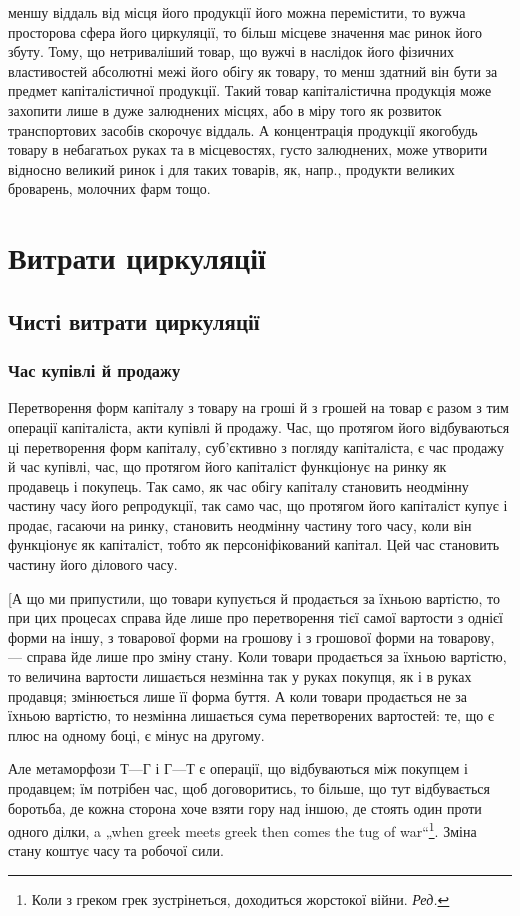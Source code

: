 \parcont{}  %
меншу віддаль від місця його продукції його можна перемістити, то
вужча просторова сфера його циркуляції, то більш місцеве значення має
ринок його збуту. Тому, що нетриваліший товар, що вужчі в наслідок
його фізичних властивостей абсолютні межі його обігу як товару, то
менш здатний він бути за предмет капіталістичної продукції. Такий
товар капіталістична продукція може захопити лише в дуже залюднених
місцях, або в міру того як розвиток транспортових засобів скорочує
віддаль. А концентрація продукції якогобудь товару в небагатьох руках
та в місцевостях, густо залюднених, може утворити відносно великий ринок
і для таких товарів, як, напр., продукти великих броварень, молочних
фарм тощо.

\section{Витрати циркуляції}

\subsection{Чисті витрати циркуляції}

\subsubsection{Час купівлі й продажу}

Перетворення форм капіталу з товару на гроші й з грошей на
товар є разом з тим операції капіталіста, акти купівлі й продажу. Час,
що протягом його відбуваються ці перетворення форм капіталу, суб’єктивно
з погляду капіталіста, є час продажу й час купівлі, час, що протягом
його капіталіст функціонує на ринку як продавець і покупець. Так само,
як час обігу капіталу становить неодмінну частину часу його репродукції,
так само час, що протягом його капіталіст купує і продає, гасаючи на
ринку, становить неодмінну частину того часу, коли він функціонує як
капіталіст, тобто як персоніфікований капітал. Цей час становить частину
його ділового часу.

\label{original-85}
[А що ми припустили, що товари купується й продається за їхньою
вартістю, то при цих процесах справа йде лише про перетворення тієї
самої вартости з однієї форми на іншу, з товарової форми на грошову
і з грошової форми на товарову, — справа йде лише про зміну стану.
Коли товари продається за їхньою вартістю, то величина вартости
лишається незмінна так у руках покупця, як і в руках продавця; змінюється
лише її форма буття. А коли товари продається не за їхньою вартістю,
то незмінна лишається сума перетворених вартостей: те, що є плюс на
одному боці, є мінус на другому.

Але метаморфози $Т — Г$ і $Г — Т$ є операції, що відбуваються між
покупцем і продавцем; їм потрібен час, щоб договоритись, то більше,
що тут відбувається боротьба, де кожна сторона хоче взяти гору над
іншою, де стоять один проти одного ділки, a „when greek meets greek
then comes the tug of war“\footnote*{
Коли з греком грек зустрінеться, доходиться жорстокої війни. \emph{Ред.}
}. Зміна стану коштує часу та робочої сили.
\parbreak{}  %
